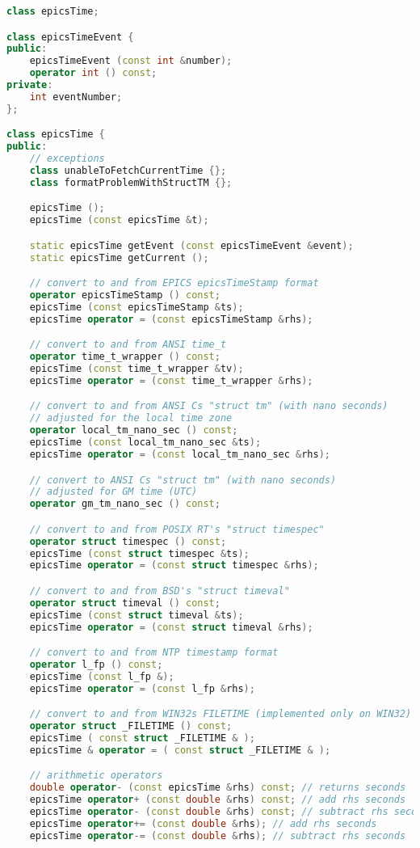 \begin{lstlisting}[language=C++]
class epicsTime;

class epicsTimeEvent {
public:
    epicsTimeEvent (const int &number);
    operator int () const;
private:
    int eventNumber;
};

class epicsTime {
public:
    // exceptions
    class unableToFetchCurrentTime {};
    class formatProblemWithStructTM {};

    epicsTime ();
    epicsTime (const epicsTime &t);

    static epicsTime getEvent (const epicsTimeEvent &event);
    static epicsTime getCurrent ();

    // convert to and from EPICS epicsTimeStamp format
    operator epicsTimeStamp () const;
    epicsTime (const epicsTimeStamp &ts);
    epicsTime operator = (const epicsTimeStamp &rhs);

    // convert to and from ANSI time_t 
    operator time_t_wrapper () const;
    epicsTime (const time_t_wrapper &tv);
    epicsTime operator = (const time_t_wrapper &rhs);

    // convert to and from ANSI Cs "struct tm" (with nano seconds)
    // adjusted for the local time zone
    operator local_tm_nano_sec () const;
    epicsTime (const local_tm_nano_sec &ts);
    epicsTime operator = (const local_tm_nano_sec &rhs);

    // convert to ANSI Cs "struct tm" (with nano seconds)
    // adjusted for GM time (UTC)
    operator gm_tm_nano_sec () const;

    // convert to and from POSIX RT's "struct timespec"
    operator struct timespec () const;
    epicsTime (const struct timespec &ts);
    epicsTime operator = (const struct timespec &rhs);

    // convert to and from BSD's "struct timeval"
    operator struct timeval () const;
    epicsTime (const struct timeval &ts);
    epicsTime operator = (const struct timeval &rhs);

    // convert to and from NTP timestamp format
    operator l_fp () const;
    epicsTime (const l_fp &);
    epicsTime operator = (const l_fp &rhs);

    // convert to and from WIN32s FILETIME (implemented only on WIN32)
    operator struct _FILETIME () const;
    epicsTime ( const struct _FILETIME & );
    epicsTime & operator = ( const struct _FILETIME & );

    // arithmetic operators
    double operator- (const epicsTime &rhs) const; // returns seconds
    epicsTime operator+ (const double &rhs) const; // add rhs seconds
    epicsTime operator- (const double &rhs) const; // subtract rhs seconds
    epicsTime operator+= (const double &rhs); // add rhs seconds
    epicsTime operator-= (const double &rhs); // subtract rhs seconds


\end{lstlisting}
